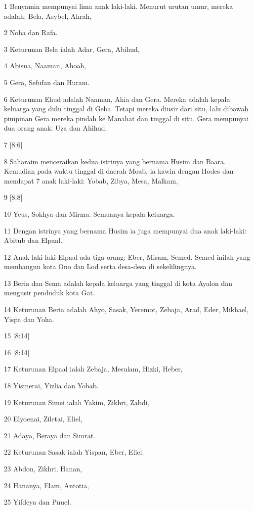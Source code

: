 \par 1 Benyamin mempunyai lima anak laki-laki. Menurut urutan umur, mereka adalah: Bela, Asybel, Ahrah,
\par 2 Noha dan Rafa.
\par 3 Keturunan Bela ialah Adar, Gera, Abihud,
\par 4 Abisua, Naaman, Ahoah,
\par 5 Gera, Sefufan dan Huram.
\par 6 Keturunan Ehud adalah Naaman, Ahia dan Gera. Mereka adalah kepala keluarga yang dulu tinggal di Geba. Tetapi mereka diusir dari situ, lalu dibawah pimpinan Gera mereka pindah ke Manahat dan tinggal di situ. Gera mempunyai dua orang anak: Uza dan Ahihud.
\par 7 [8:6]
\par 8 Saharaim menceraikan kedua istrinya yang bernama Husim dan Baara. Kemudian pada waktu tinggal di daerah Moab, ia kawin dengan Hodes dan mendapat 7 anak laki-laki: Yobab, Zibya, Mesa, Malkam,
\par 9 [8:8]
\par 10 Yeus, Sokhya dan Mirma. Semuanya kepala keluarga.
\par 11 Dengan istrinya yang bernama Husim ia juga mempunyai dua anak laki-laki: Abitub dan Elpaal.
\par 12 Anak laki-laki Elpaal ada tiga orang: Eber, Misam, Semed. Semed inilah yang membangun kota Ono dan Lod serta desa-desa di sekelilingnya.
\par 13 Beria dan Sema adalah kepala keluarga yang tinggal di kota Ayalon dan mengusir penduduk kota Gat.
\par 14 Keturunan Beria adalah Ahyo, Sasak, Yeremot, Zebaja, Arad, Eder, Mikhael, Yispa dan Yoha.
\par 15 [8:14]
\par 16 [8:14]
\par 17 Keturunan Elpaal ialah Zebaja, Mesulam, Hizki, Heber,
\par 18 Yismerai, Yizlia dan Yobab.
\par 19 Keturunan Simei ialah Yakim, Zikhri, Zabdi,
\par 20 Elyoenai, Ziletai, Eliel,
\par 21 Adaya, Beraya dan Simrat.
\par 22 Keturunan Sasak ialah Yispan, Eber, Eliel.
\par 23 Abdon, Zikhri, Hanan,
\par 24 Hananya, Elam, Antotia,
\par 25 Yifdeya dan Pnuel.
